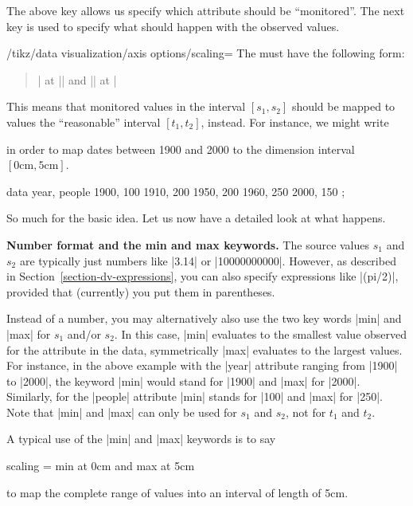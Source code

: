 The above key allows us specify which attribute should be
``monitored''. The next key is used to specify what should happen with
the observed values.

\begin{key}{/tikz/data visualization/axis options/scaling=}
  The  must have the following form:
  \begin{quote}
    | at || and || at |
  \end{quote}
  This means that monitored values in the interval $[s_1,s_2]$ should
  be mapped to values the ``reasonable'' interval $[t_1,t_2]$,
  instead. For instance, we might write
\begin{codeexample}
\end{codeexample}
  in order to map dates between 1900 and 2000 to the dimension
  interval $[0\mathrm{cm},5\mathrm{cm}]$.
\begin{codeexample}[]
\tikz \datavisualization
   [scientific axes,
    x axis={attribute=people, length=2.5cm, ticks=few},
    y axis={attribute=year, scaling=1900 at 0cm and 2000 at 5cm},
    visualize as scatter]
  data {
    year, people
    1900, 100
    1910, 200
    1950, 200
    1960, 250
    2000, 150
  };
\end{codeexample}
  So much for the basic idea. Let us now have a detailed look at what
  happens.

  \medskip
  \textbf{Number format and the min and max keywords.}
  The source values $s_1$ and $s_2$ are typically just numbers like
  |3.14| or |10000000000|. However, as described in
  Section~\ref{section-dv-expressions}, you can also specify
  expressions like |(pi/2)|, provided that (currently) you put them in
  parentheses.

  Instead of a number, you may alternatively also use the two key
  words |min| and |max| for $s_1$ and/or $s_2$. In this case, |min|
  evaluates to the smallest value observed for the attribute in the
  data, symmetrically |max| evaluates to the largest values. For
  instance, in the above example with the |year| attribute ranging
  from |1900| to |2000|, the keyword |min| would stand for |1900| and
  |max| for |2000|. Similarly, for the |people| attribute |min| stands
  for |100| and |max| for |250|. Note that |min| and |max| can only be
  used for $s_1$ and $s_2$, not for $t_1$ and $t_2$.

  A typical use of the |min| and |max| keywords is to say
\begin{codeexample}
scaling = min at 0cm and max at 5cm    
\end{codeexample}
  to map the complete range of values into an interval of length of
  5cm. 


\end{key}
